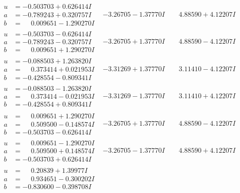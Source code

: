 \documentclass[1p]{elsarticle_modified}
\theoremstyle{definition}
\begin{document}
$$\begin{array}{c|c|c}
\begin{aligned}
u &= -0.503703 + 0.626414 I \\
a &= -0.789243 + 0.320757 I \\
b &= \phantom{-}0.009651 - 1.290270 I\end{aligned}
 & -3.26705 - 1.37770 I & \phantom{-}4.88590 + 4.12207 I \\ \hline\begin{aligned}
u &= -0.503703 - 0.626414 I \\
a &= -0.789243 - 0.320757 I \\
b &= \phantom{-}0.009651 + 1.290270 I\end{aligned}
 & -3.26705 + 1.37770 I & \phantom{-}4.88590 - 4.12207 I \\ \hline\begin{aligned}
u &= -0.088503 + 1.263820 I \\
a &= \phantom{-}0.373414 + 0.021953 I \\
b &= -0.428554 - 0.809341 I\end{aligned}
 & -3.31269 + 1.37770 I & \phantom{-}3.11410 - 4.12207 I \\ \hline\begin{aligned}
u &= -0.088503 - 1.263820 I \\
a &= \phantom{-}0.373414 - 0.021953 I \\
b &= -0.428554 + 0.809341 I\end{aligned}
 & -3.31269 - 1.37770 I & \phantom{-}3.11410 + 4.12207 I \\ \hline\begin{aligned}
u &= \phantom{-}0.009651 + 1.290270 I \\
a &= \phantom{-}0.509500 - 0.148574 I \\
b &= -0.503703 - 0.626414 I\end{aligned}
 & -3.26705 + 1.37770 I & \phantom{-}4.88590 - 4.12207 I \\ \hline\begin{aligned}
u &= \phantom{-}0.009651 - 1.290270 I \\
a &= \phantom{-}0.509500 + 0.148574 I \\
b &= -0.503703 + 0.626414 I\end{aligned}
 & -3.26705 - 1.37770 I & \phantom{-}4.88590 + 4.12207 I \\ \hline\begin{aligned}
u &= \phantom{-}0.20839 + 1.39977 I \\
a &= \phantom{-}0.934651 - 0.300202 I \\
b &= -0.830600 - 0.398708 I\end{aligned}

\end{array}$$
\end{document}
